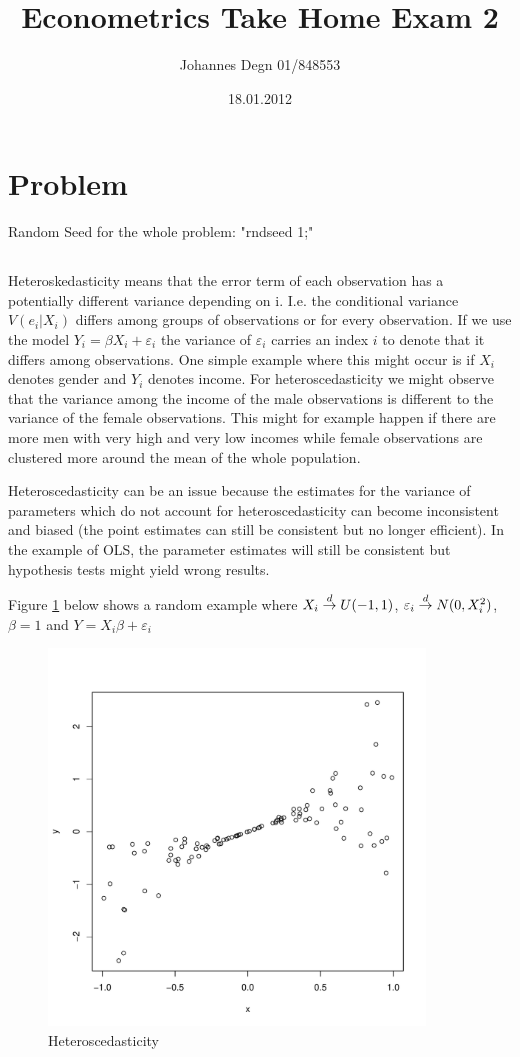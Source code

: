 \documentclass[11pt]{article}
\title{\textbf{Econometrics Take Home Exam 2}}
\author{Johannes Degn 01/848553}
\date{18.01.2012}
\theoremstyle{break}
\begin{document}
\maketitle


\section{Problem}
Random Seed for the whole problem: "rndseed 1;"

\subsection{}
Heteroskedasticity means that the error term of each observation has a potentially different variance depending on i. I.e. the conditional variance $V(e_i|X_i)$ differs among groups of observations or for every observation. If we use the model $Y_i = \beta X_i + \varepsilon_i$ the variance of $\varepsilon_i$ carries an index $i$ to denote that it differs among observations. One simple example where this might occur is if $X_i$ denotes gender and $Y_i$ denotes income. For heteroscedasticity we might observe that the variance among the income of the male observations is different to the variance of the female observations. This might for example happen if there are more men with very high and very low incomes while female observations are clustered more around the mean of the whole population.

Heteroscedasticity can be an issue because the estimates for the variance of parameters which do not account for heteroscedasticity can become inconsistent and biased (the point estimates can still be consistent but no longer efficient). In the example of OLS, the parameter estimates will still be consistent but hypothesis tests might yield wrong results.

Figure \ref{heteroscedasticity} below shows a random example where $X_i \;{\buildrel d \over \rightarrow}\; U(-1, 1)$, $\varepsilon_i \;{\buildrel d \over \rightarrow}\; N(0, X_i^2)$, $\beta = 1$ and $Y = X_i\beta+\varepsilon_i$

\begin{figure}[H]
\centering
\includegraphics[height=100mm]{heteroscedasticity.pdf}
\caption{Heteroscedasticity}
\label{heteroscedasticity}
\end{figure}
\end{document}
